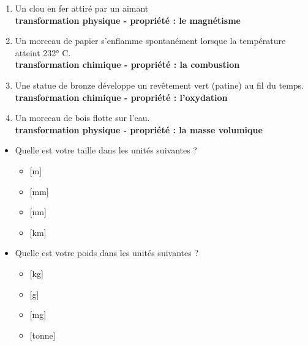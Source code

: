 \documentclass[
  11pt,
  french,
  a4paper,
  openany]{book}
\providecommand{\tightlist}{%
  \setlength{\itemsep}{0pt}\setlength{\parskip}{0pt}}
\begin{document}
\begin{Answer}

\begin{enumerate}
\def\labelenumi{\arabic{enumi}.}
\tightlist
\item
  Un clou en fer attiré par un aimant\\
  \textbf{transformation physique - propriété : le magnétisme}
\item
  Un morceau de papier s'enflamme spontanément lorsque la température atteint 232° C.\\
  \textbf{transformation chimique - propriété : la combustion}
\item
  Une statue de bronze développe un revêtement vert (patine) au fil du temps.\\
  \textbf{transformation chimique - propriété : l'oxydation}
\item
  Un morceau de bois flotte sur l'eau.\\
  \textbf{transformation physique - propriété : la masse volumique}
\end{enumerate}


\end{Answer}

\begin{Exercise}

\begin{itemize}
\tightlist
\item
  Quelle est votre taille dans les unités suivantes ?

  \begin{itemize}
  \tightlist
  \item
    {[}m{]}
  \item
    {[}mm{]}
  \item
    {[}nm{]}
  \item
    {[}km{]}
  \end{itemize}
\item
  Quelle est votre poids dans les unités suivantes ?

  \begin{itemize}
  \tightlist
  \item
    {[}kg{]}
  \item
    {[}g{]}
  \item
    {[}mg{]}
  \item
    {[}tonne{]}
  \end{itemize}
\end{itemize}


\end{Exercise}
\end{document}
